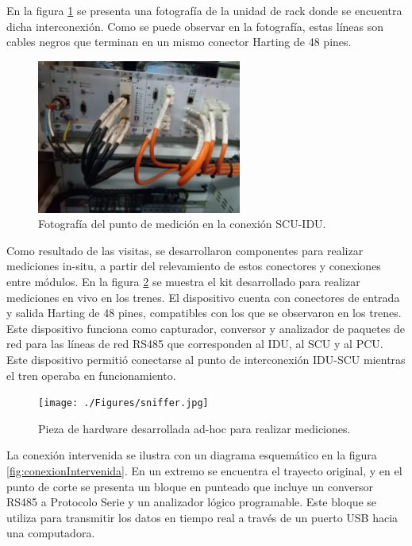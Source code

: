En la figura \ref{fig:conexionOriginalFoto} se presenta una fotografía de la unidad de rack donde se encuentra dicha interconexión. Como se puede observar en la fotografía, estas líneas son cables negros que terminan en un mismo conector Harting de 48 pines. \\


\begin{figure}[H]
	\centering    
      \includegraphics[width=0.6\textwidth]{./Figures/rackPIDS2.jpg}
	\caption{Fotografía del punto de medición en la conexión SCU-IDU.}
	\label{fig:conexionOriginalFoto}
\end{figure}


Como resultado de las visitas, se desarrollaron componentes para realizar mediciones in-situ, a partir del relevamiento de estos conectores y conexiones entre módulos. En la figura \ref{fig:sniffer} se muestra el kit desarrollado para realizar mediciones en vivo en los trenes. El dispositivo cuenta con conectores de entrada y salida Harting de 48 pines, compatibles con los que se observaron en los trenes. Este dispositivo funciona como capturador, conversor y analizador de paquetes de red para las líneas de red RS485 que corresponden al IDU, al SCU y al PCU. Este dispositivo permitió conectarse al punto de interconexión IDU-SCU mientras el tren operaba en funcionamiento.\\


\begin{figure}[H]
	\centering
	\texttt{[image: ./Figures/sniffer.jpg]}
	\caption{Pieza de hardware desarrollada ad-hoc para realizar mediciones.}
	\label{fig:sniffer}
\end{figure}

 La conexión intervenida se ilustra con un diagrama esquemático en la figura \ref{fig:conexionIntervenida}. En un extremo se encuentra el trayecto original, y en el punto de corte se presenta un bloque en punteado que incluye un conversor RS485 a Protocolo Serie y un analizador lógico programable. Este bloque se utiliza para transmitir los datos en tiempo real a través de un puerto USB hacia una computadora.\\

